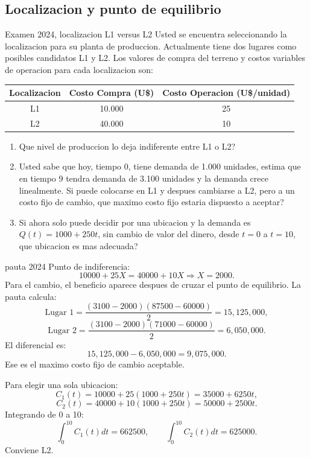 \subsection{Localizacion y punto de equilibrio}

\begin{enunciado}{Examen 2024, localizacion L1 versus L2}
Usted se encuentra seleccionando la localizacion para su planta de produccion. Actualmente tiene dos lugares como posibles candidatos L1 y L2. Los valores de compra del terreno y costos variables de operacion para cada localizacion son:

\begin{center}
\begin{tabular}{c|cc}
\toprule
Localizacion & Costo Compra (U\$) & Costo Operacion (U\$/unidad)\\
\midrule
L1 & 10.000 & 25\\
L2 & 40.000 & 10\\
\bottomrule
\end{tabular}
\end{center}

\begin{enumerate}[label=\alph*)]
  \item Que nivel de produccion lo deja indiferente entre L1 o L2?
  \item Usted sabe que hoy, tiempo 0, tiene demanda de 1.000 unidades, estima que en tiempo 9 tendra demanda de 3.100 unidades y la demanda crece linealmente. Si puede colocarse en L1 y despues cambiarse a L2, pero a un costo fijo de cambio, que maximo costo fijo estaria dispuesto a aceptar?
  \item Si ahora solo puede decidir por una ubicacion y la demanda es $Q(t)=1000+250t$, sin cambio de valor del dinero, desde $t=0$ a $t=10$, que ubicacion es mas adecuada?
\end{enumerate}
\end{enunciado}

\begin{pautacompleta}{pauta 2024}
Punto de indiferencia:
\[
  10000+25X=40000+10X
  \Rightarrow X=2000.
\]
Para el cambio, el beneficio aparece despues de cruzar el punto de equilibrio. La pauta calcula:
\[
  \text{Lugar 1}=\frac{(3100-2000)(87500-60000)}{2}=15{,}125{,}000,
\]
\[
  \text{Lugar 2}=\frac{(3100-2000)(71000-60000)}{2}=6{,}050{,}000.
\]
El diferencial es:
\[
  15{,}125{,}000-6{,}050{,}000=9{,}075{,}000.
\]
Ese es el maximo costo fijo de cambio aceptable.

Para elegir una sola ubicacion:
\[
  C_1(t)=10000+25(1000+250t)=35000+6250t,
\]
\[
  C_2(t)=40000+10(1000+250t)=50000+2500t.
\]
Integrando de 0 a 10:
\[
  \int_0^{10}C_1(t)dt=662500,
  \qquad
  \int_0^{10}C_2(t)dt=625000.
\]
Conviene L2.
\end{pautacompleta}

